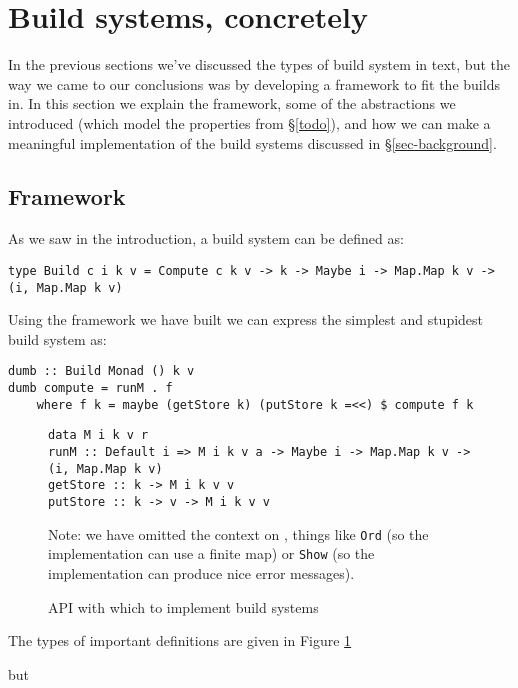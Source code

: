 \clearpage
\section{Build systems, concretely}\label{sec-examples}

In the previous sections we've discussed the types of build system in text, but the way we came to our conclusions was by developing a framework to fit the builds in. In this section we explain the framework, some of the abstractions we introduced (which model the properties from \S\ref{todo}), and how we can make a meaningful implementation of the build systems discussed in \S\ref{sec-background}.

\subsection{Framework}

As we saw in the introduction, a build system can be defined as:

\begin{verbatim}
type Build c i k v = Compute c k v -> k -> Maybe i -> Map.Map k v -> (i, Map.Map k v)
\end{verbatim}

Using the framework we have built we can express the simplest and stupidest build system as:

\begin{verbatim}
dumb :: Build Monad () k v
dumb compute = runM . f
    where f k = maybe (getStore k) (putStore k =<<) $ compute f k
\end{verbatim}

\begin{figure}
\begin{verbatim}
data M i k v r
runM :: Default i => M i k v a -> Maybe i -> Map.Map k v -> (i, Map.Map k v)
getStore :: k -> M i k v v
putStore :: k -> v -> M i k v v
\end{verbatim}
Note: we have omitted the context on , things like \texttt{Ord} (so the implementation can use a finite map) or \texttt{Show} (so the implementation can produce nice error messages).
\caption{API with which to implement build systems}
\label{fig-M-api}
\end{figure}
  
The types of important definitions are given in Figure \ref{fig-M-api}





but 



